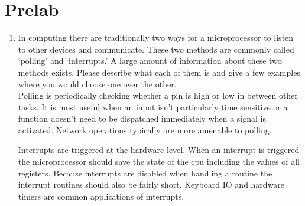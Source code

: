 \documentclass[12pt,letterpaper]{article}
\begin{document}
\section{Prelab}
\begin{enumerate}
    \item In computing there are traditionally two ways for a microprocessor to
    listen to other devices and communicate. These two methods are commonly
    called  ‘polling’  and  ‘interrupts.’  A  large  amount  of information
    about  these  two  methods  exists.  Please  describe  what each of them
    is and give a few examples where you would choose one over the other.\\

    Polling is periodically checking whether a pin is high or low in between
    other tasks. It is most useful when an input isn't particularly time
    sensitive or a function doesn't need to be dispatched immediately when a
    signal is activated. Network operations typically are more amenable to
    polling.

    Interrupts are triggered at the hardware level. When an interrupt is
    triggered the microprocessor should save the state of the cpu including the
    values of all registers. Because interrupts are disabled when handling a
    routine the interrupt routines should also be fairly short. Keyboard IO and
    hardware timers are common applications of interrupts.


\end{enumerate}
\end{document}

